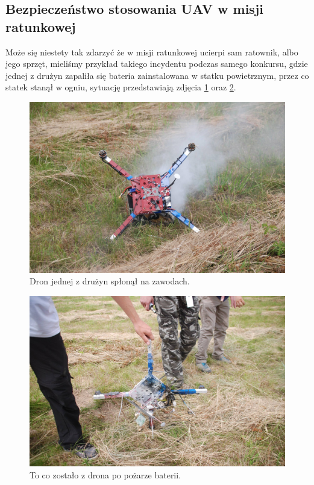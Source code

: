 \subsection{Bezpieczeństwo stosowania UAV w misji ratunkowej}
Może się niestety tak zdarzyć że w misji ratunkowej ucierpi sam ratownik, albo jego sprzęt, mieliśmy przykład takiego incydentu podczas samego konkursu, gdzie jednej z drużyn zapaliła się bateria zainstalowana w statku powietrznym, przez co statek stanął w ogniu, sytuację przedstawiają zdjęcia \ref{fig:ploniedron1} oraz \ref{fig:ploniedron2}.

\begin{figure}[!th]
    \centering
    \includegraphics[width=15cm]{zalaczniki/obrazy/ploniedron1.jpg}
    \caption{Dron jednej z drużyn spłonął na zawodach.}
    \label{fig:ploniedron1}
\end{figure}

\begin{figure}[!th]
    \centering
    \includegraphics[width=15cm]{zalaczniki/obrazy/ploniedron2.jpg}
    \caption{To co zostało z drona po pożarze baterii.}
    \label{fig:ploniedron2}
\end{figure}

